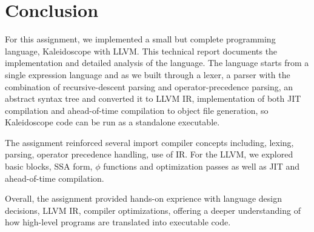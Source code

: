 \documentclass[acmlarge, nonacm]{acmart}
\begin{document}
\section{Conclusion}
For this assignment, we implemented a small but complete programming language, Kaleidoscope with LLVM. This technical report documents the implementation and detailed analysis of the language. The language starts from a single expression language and as we built through a lexer, a parser with the combination of recursive-descent parsing and operator-precedence parsing, an abstract syntax tree and converted it to LLVM IR, implementation of both JIT compilation and ahead-of-time compilation to object file generation, so Kaleidoscope code can be run as a standalone executable.

The assignment reinforced several import compiler concepts including, lexing, parsing, operator precedence  handling, use of IR. For the LLVM, we explored basic blocks, SSA form, $\phi$ functions and optimization passes as well as JIT and ahead-of-time compilation.

Overall, the assignment provided hands-on exprience with language design decisions, LLVM IR, compiler optimizations, offering a deeper understanding of how high-level programs are translated into executable code.





\end{document}
